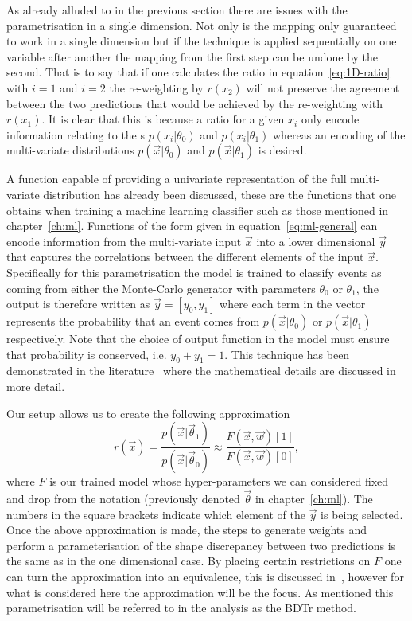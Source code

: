 As already alluded to in the previous section there are issues with the
parametrisation in a single dimension. Not only is the mapping only guaranteed
to work in a single dimension but if the technique is applied sequentially on
one variable after another the mapping from the first step can be undone by the
second. That is to say that if one calculates the ratio in
equation~\ref{eq:1D-ratio} with $i=1$ and $i=2$ the re-weighting by $r(x_2)$
will not preserve the agreement between the two predictions that would be
achieved by the re-weighting with $r(x_1)$. It is clear that this is because a
ratio for a given $x_i$ only encode information relating to the \PDF s
$p(x_i|\theta_0)$ and $p(x_i|\theta_1)$ whereas an encoding of the multi-variate
distributions $p(\vec{x}|\theta_0)$ and $p(\vec{x}|\theta_1)$ is desired.

A function capable of providing a univariate representation of the full
multi-variate distribution has already been discussed, these are the functions
that one obtains when training a machine learning classifier such as those
mentioned in chapter~\ref{ch:ml}. Functions of the form given in
equation~\ref{eq:ml-general} can encode information from the multi-variate input
$\vec{x}$ into a lower dimensional $\vec{y}$ that captures the correlations
between the different elements of the input $\vec{x}$. Specifically for this
parametrisation the model is trained to classify events as coming from either
the Monte-Carlo generator with parameters $\theta_0$ or $\theta_1$, the output
is therefore written as $\vec{y} = [y_0, y_1]$ where each term in the vector
represents the probability that an event comes from $p(\vec{x} | \theta_0)$ or
$p(\vec{x} | \theta_1)$ respectively. Note that the choice of output function in
the model must ensure that probability is conserved, i.e. $y_0 + y_1 = 1$. This
technique has been demonstrated in the
literature~\cite{cranmer2016approximating} where the mathematical details are
discussed in more detail.

Our setup allows us to create the following approximation
\begin{equation}
  r(\vec{x}) =  \frac{p(\vec{x}|\vec{\theta}_{1})}{p(\vec{x}|\vec{\theta}_{0})}
  \approx \frac{F(\vec{x}, \vec{w})[1]}{F(\vec{x}, \vec{w})[0]},
  \label{eq:bdtr-approximation}
\end{equation}
where $F$ is our trained model whose hyper-parameters we can considered fixed
and drop from the notation (previously denoted $\vec{\theta}$ in
chapter~\ref{ch:ml}). The numbers in the square brackets indicate which element
of the $\vec{y}$ is being selected. Once the above approximation is made, the
steps to generate weights and perform a parameterisation of the shape
discrepancy between two predictions is the same as in the one dimensional case.
By placing certain restrictions on $F$ one can turn the approximation into an
equivalence, this is discussed in~\cite{VHModellingNote2019}, however for what
is considered here the approximation will be the focus. As mentioned this
parametrisation will be referred to in the analysis as the BDTr method.

